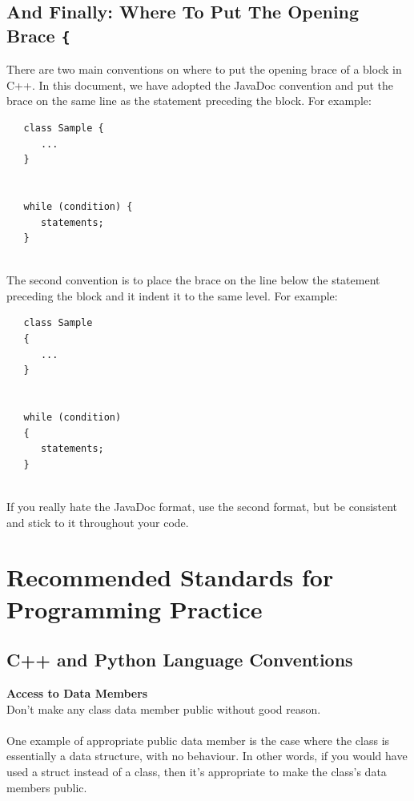 \documentclass{CSSRforAfrica}
\newcommand{\blank}{~\\}
\begin{document}
\begin{appendices}
\subsection{And Finally: Where To Put The Opening Brace {\tt \{}}
There are two main conventions on where to put the opening brace of a block in C++.
In this document, we have adopted the JavaDoc convention and put the brace on the 
same line as the statement preceding the block.  For example:
{\small
\begin{verbatim}
   class Sample {  
      ...
   }
 

   while (condition) {
      statements;
   } 
\end{verbatim}
}
\blank
The second convention is to place the brace on the line below the statement preceding the 
block and it indent it to the same level.  For example:
{\small
\begin{verbatim}
   class Sample 
   {  
      ...
   }


   while (condition) 
   {
      statements;
   } 
\end{verbatim}
}
\blank
If you really hate the JavaDoc format, use the second format, but be consistent and
stick to it throughout your code.

\newpage  
 
\section{Recommended Standards for Programming Practice }
\label{appendix:programming_practice_standards}  

  
 
\subsection{C++ and Python Language Conventions}

{\bf Access to Data Members}\\
Don't make any class data member public without good reason. 
\blank
~
\blank
One example of appropriate public data member is the case where the class is essentially a
data structure, with no behaviour. In other words, if you would have used a struct instead of a
class, then it's appropriate to make the class's data members public.




\end{appendices}
\end{document}
